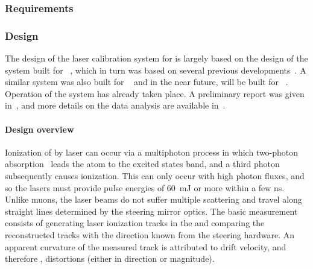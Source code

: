 




\subsubsection{Requirements}
\label{sec:sp-calib-laser-req}








\subsubsection{Design}
\label{sec:sp-calib-sys-las-ion-des}

The design of the laser calibration system for  is largely based on the design of the system built for ~\cite{microboone}, which in turn was based on several previous developments~\cite{Rossi:2009im,Zeller:2013sva,Ereditato:2014lra,Ereditato:82014tya}. A similar system was also built for ~\cite{Berns:2013usa} and in the near future, will be built for ~\cite{Antonello:2015lea}. Operation of the  system has already taken place. A preliminary report was given in~\cite{bib:chen2018}, and more details on the data analysis are available in~\cite{bib:uBlaser2019}.

\paragraph{Design overview}
Ionization of  by laser can occur via a multiphoton process in which two-photon absorption~\cite{Badhrees:2010zz} leads the atom to the excited states band, and a third photon subsequently causes ionization. This can only occur with high photon fluxes, and so the lasers must provide pulse energies of \SI{60}{\milli\joule} or more within a few ns. Unlike muons, the laser beams do not suffer multiple scattering and travel along straight lines determined by the steering mirror optics. The basic measurement consists of %
generating laser ionization tracks in the  and comparing the reconstructed tracks with the direction known from the steering hardware. 
An apparent curvature of the measured track is attributed to drift velocity, and therefore \efield, distortions (either in direction or magnitude).


